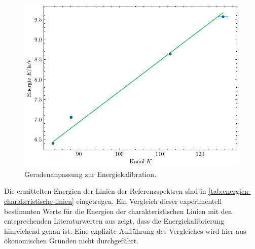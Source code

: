 \begin{figure}[H]
	\centering
	\includegraphics[width=0.6\linewidth]{../figs/kallibrationskurve.pdf}
	\caption{Geradenanpassung zur Energiekalibration.}
	\label{fig:kalibrationskurve}
\end{figure} Die ermittelten Energien der Linien der Referenzspektren sind in \cref{tab:energien-charakeristische-linien} eingetragen. Ein Vergleich
dieser experimentell bestimmten Werte für die Energien der charakteristischen Linien mit den entsprechenden Literaturwerten aus \cite{xraydata} zeigt,
dass die Energiekalibrierung hinreichend genau ist. Eine explizite Aufführung des Vergleiches wird hier aus ökonomischen Gründen nicht durchgeführt.
